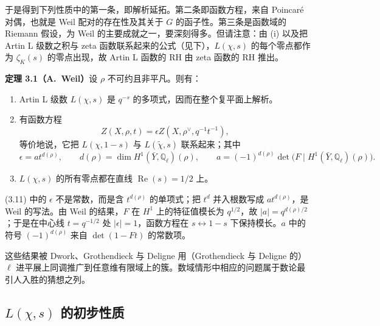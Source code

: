 于是得到下列性质中的第一条，即解析延拓。第二条即函数方程，来自 Poincaré 对偶，也就是 Weil 配对的存在性及其关于 $G$ 的函子性。第三条是函数域的 Riemann 假设，为 Weil 的主要成就之一，要深刻得多。但请注意：由 (i) 以及把 Artin L 级数之积与 zeta 函数联系起来的公式（见下），$L(\chi,s)$ 的每个零点都作为 $\zeta_K(s)$ 的零点出现，故 Artin L 函数的 RH 由 zeta 函数的 RH 推出。

\par\medskip\noindent\textbf{定理 3.1（A.~Weil）}\quad 设 $\rho$ 不可约且非平凡。则有：
\begin{enumerate}[label=(\roman*),leftmargin=2.6em,itemsep=0.3em]
\item Artin L 级数 $L(\chi,s)$ 是 $q^{-s}$ 的多项式，因而在整个复平面上解析。
\item 有函数方程
\begin{equation}\tag{3.11}\label{c4:eq:3.11}
Z(X,\rho,t)=\epsilon Z(X,\rho^{\vee},q^{-1}t^{-1}),
\end{equation}
等价地说，它把 $L(\chi,1-s)$ 与 $L(\tilde\chi,s)$ 联系起来；其中
\[
\epsilon=at^{d(\rho)},\qquad d(\rho)=\dim H^{1}(\bar Y,\mathbb{Q}_\ell)(\rho),\qquad
a=(-1)^{d(\rho)}\det\bigl(F\mid H^{1}(\bar Y,\mathbb{Q}_\ell)(\rho)\bigr).
\]
\item $L(\chi,s)$ 的所有零点都在直线 $\operatorname{Re}(s)=1/2$ 上。
\end{enumerate}

\begin{annote}
(3.11) 中的 $\epsilon$ 不是常数，而是含 $t^{d(\rho)}$ 的单项式；把 $t^{d}$ 并入根数写成 $at^{d(\rho)}$，是 Weil 的写法。由 Weil 的结果，$F$ 在 $H^{1}$ 上的特征值模长为 $q^{1/2}$，故 $|a|=q^{d(\rho)/2}$；于是在中心线 $t=q^{-1/2}$ 处 $|\epsilon|=1$，函数方程在 $s\leftrightarrow1-s$ 下保持模长。$a$ 中的符号 $(-1)^{d(\rho)}$ 来自 $\det(1-Ft)$ 的常数项。
\par\vspace{0.15em}{\raggedleft 【来源：Weil《Courbes algébriques et variétés abéliennes》（A）；Milne《Étale Cohomology》Ch.~VI（A）】\par}
\end{annote}

这些结果被 Dwork、Grothendieck 与 Deligne 用（Grothendieck 与 Deligne 的）$\ell$ 进平展上同调推广到任意维有限域上的簇。数域情形中相应的问题属于数论最引人入胜的猜想之列。

\subsection{$L(\chi,s)$ 的初步性质}\label{c4:sec:3.4}

